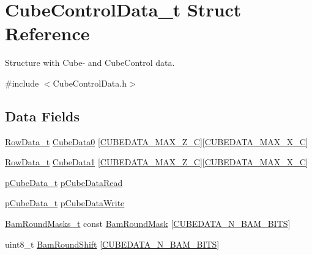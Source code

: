 \hypertarget{structCubeControlData__t}{}\section{Cube\+Control\+Data\+\_\+t Struct Reference}
\label{structCubeControlData__t}


Structure with Cube-\/ and Cube\+Control data.  




{\ttfamily \#include $<$Cube\+Control\+Data.\+h$>$}

\subsection*{Data Fields}
\begin{DoxyCompactItemize}
\item 
\hyperlink{structRowData__t}{Row\+Data\+\_\+t} \hyperlink{structCubeControlData__t_a1cf738638ac947d80a643d159c8eb2a2}{Cube\+Data0} \mbox{[}\hyperlink{CubeControlData_8h_af8a3cd66f1181d1c4119a4e51a4015f8}{C\+U\+B\+E\+D\+A\+T\+A\+\_\+\+M\+A\+X\+\_\+\+Z\+\_\+\+C}\mbox{]}\mbox{[}\hyperlink{CubeControlData_8h_aaf8754e50e21c648edd86850eedb5a63}{C\+U\+B\+E\+D\+A\+T\+A\+\_\+\+M\+A\+X\+\_\+\+X\+\_\+\+C}\mbox{]}
\item 
\hyperlink{structRowData__t}{Row\+Data\+\_\+t} \hyperlink{structCubeControlData__t_aed097662b3a0f9935e47ee9d209b8da0}{Cube\+Data1} \mbox{[}\hyperlink{CubeControlData_8h_af8a3cd66f1181d1c4119a4e51a4015f8}{C\+U\+B\+E\+D\+A\+T\+A\+\_\+\+M\+A\+X\+\_\+\+Z\+\_\+\+C}\mbox{]}\mbox{[}\hyperlink{CubeControlData_8h_aaf8754e50e21c648edd86850eedb5a63}{C\+U\+B\+E\+D\+A\+T\+A\+\_\+\+M\+A\+X\+\_\+\+X\+\_\+\+C}\mbox{]}
\item 
\hyperlink{structRowData__t}{p\+Cube\+Data\+\_\+t} \hyperlink{structCubeControlData__t_ac61459fc1e13ce1d7fb20222c6d07214}{p\+Cube\+Data\+Read}
\item 
\hyperlink{structRowData__t}{p\+Cube\+Data\+\_\+t} \hyperlink{structCubeControlData__t_a6ced180bdd8e8518a86f8f40888fddf2}{p\+Cube\+Data\+Write}
\item 
\hyperlink{CubeControlData_8h_a2b6850a8815b785ea51f17c4d979706e}{Bam\+Round\+Masks\+\_\+t} const \hyperlink{structCubeControlData__t_acf3c32d2a6071404856c5db95846864c}{Bam\+Round\+Mask} \mbox{[}\hyperlink{CubeControlData_8h_ae8163b1995363e0daae4ac54ee4d1dd9}{C\+U\+B\+E\+D\+A\+T\+A\+\_\+\+N\+\_\+\+B\+A\+M\+\_\+\+B\+I\+T\+S}\mbox{]}
\item 
uint8\+\_\+t \hyperlink{structCubeControlData__t_aa97c584a57c1f2500791985bbe8aef89}{Bam\+Round\+Shift} \mbox{[}\hyperlink{CubeControlData_8h_ae8163b1995363e0daae4ac54ee4d1dd9}{C\+U\+B\+E\+D\+A\+T\+A\+\_\+\+N\+\_\+\+B\+A\+M\+\_\+\+B\+I\+T\+S}\mbox{]}
\end{DoxyCompactItemize}


